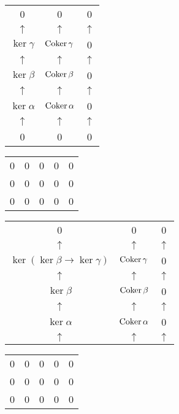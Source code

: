 \documentclass[../main.tex]{subfiles}
\begin{document}
\begin{table}[h]
\begin{minipage}{.4\linewidth}
\centering
\begin{tabular}{ |c c c } 
 0 & 0 & 0 \\ 
 $\uparrow$   &	 $\uparrow$   & $\uparrow$   \\
 $\ker\gamma$ & $\operatorname{Coker}\gamma$ & 0 \\
 $\uparrow$   &	 $\uparrow$   & $\uparrow$   \\
 $\ker\beta$ & $\operatorname{Coker}\beta$ & 0 \\
 $\uparrow$   &	 $\uparrow$   & $\uparrow$   \\
 $\ker\alpha$ & $\operatorname{Coker}\alpha$ & 0 \\
 $\uparrow$   &	 $\uparrow$   & $\uparrow$   \\
 0 & 0 & 0 \\ 
 \hline
\end{tabular}
\end{minipage}
\begin{minipage}{.4\linewidth}
\centering
\begin{tabular}{ |c c c c c} 
 0 & 0 & 0 & 0 & 0\\ 
 0 & 0 & 0 & 0 & 0\\
 0 & 0 & 0 & 0 & 0 \\
 \hline
\end{tabular}
\end{minipage}
\end{table}

\begin{table}[h]
\begin{minipage}{.4\linewidth}
\centering
\begin{tabular}{ |c c c } 
 0 & 0 & 0 \\ 
 $\uparrow$   &	 $\uparrow$   & $\uparrow$   \\
 $\ker(\ker\beta \rightarrow \ker\gamma)$ & $\operatorname{Coker}\gamma$ & 0 \\
 $\uparrow$   &	 $\uparrow$   & $\uparrow$   \\
 $\ker\beta$ & $\operatorname{Coker}\beta$ & 0 \\
 $\uparrow$   &	 $\uparrow$   & $\uparrow$   \\
 $\ker\alpha$ & $\operatorname{Coker}\alpha$ & 0 \\
 $\uparrow$   &	 $\uparrow$   & $\uparrow$   
 \hline
\end{tabular}
\end{minipage}
\begin{minipage}{.4\linewidth}
\centering
\begin{tabular}{ |c c c c c} 
 0 & 0 & 0 & 0 & 0\\ 
 0 & 0 & 0 & 0 & 0\\
 0 & 0 & 0 & 0 & 0 \\
 \hline
\end{tabular}
\end{minipage}
\end{table}
\end{document}
